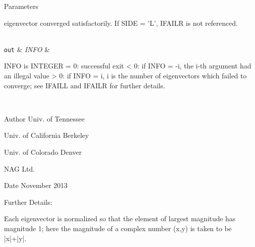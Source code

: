 \begin{DoxyParams}[1]{Parameters}
\begin{DoxyVerb}
          eigenvector converged satisfactorily.
          If SIDE = 'L', IFAILR is not referenced.\end{DoxyVerb}
\\
\hline
\mbox{\tt out}  & {\em I\+N\+F\+O} & \begin{DoxyVerb}          INFO is INTEGER
          = 0:  successful exit
          < 0:  if INFO = -i, the i-th argument had an illegal value
          > 0:  if INFO = i, i is the number of eigenvectors which
                failed to converge; see IFAILL and IFAILR for further
                details.\end{DoxyVerb}
 \\
\hline
\end{DoxyParams}
\begin{DoxyAuthor}{Author}
Univ. of Tennessee 

Univ. of California Berkeley 

Univ. of Colorado Denver 

N\+A\+G Ltd. 
\end{DoxyAuthor}
\begin{DoxyDate}{Date}
November 2013 
\end{DoxyDate}
\begin{DoxyParagraph}{Further Details\+: }
\begin{DoxyVerb}  Each eigenvector is normalized so that the element of largest
  magnitude has magnitude 1; here the magnitude of a complex number
  (x,y) is taken to be |x|+|y|.\end{DoxyVerb}
 
\end{DoxyParagraph}
